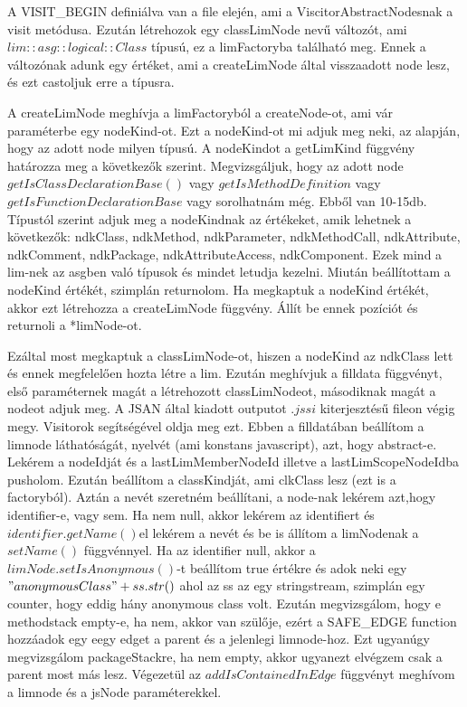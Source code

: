 A VISIT\_BEGIN definiálva van a file elején, ami a ViscitorAbstractNodesnak a visit metódusa.
Ezután létrehozok egy classLimNode nevű változót, ami ${lim::asg::logical::Class}$ típusú, ez a limFactoryba található meg.
Ennek a változónak adunk egy értéket, ami a createLimNode által visszaadott node lesz, és ezt castoljuk erre a típusra.

\noindent

A createLimNode meghívja a limFactoryból a createNode-ot, ami vár paraméterbe egy nodeKind-ot. Ezt a nodeKind-ot mi adjuk meg neki, az alapján, hogy az adott node milyen típusú.
A nodeKindot a getLimKind függvény határozza meg a következők szerint.
Megvizsgáljuk, hogy az adott node $getIsClassDeclarationBase()$ vagy $getIsMethodDefinition$ vagy $getIsFunctionDeclarationBase$ vagy sorolhatnám még. Ebből van 10-15db.
Típustól szerint adjuk meg a nodeKindnak az értékeket, amik lehetnek a következők: ndkClass, ndkMethod, ndkParameter, ndkMethodCall, ndkAttribute, ndkComment, ndkPackage, ndkAttributeAccess, ndkComponent.
Ezek mind a lim-nek az asgben való típusok és mindet letudja kezelni. Miután beállítottam a nodeKind értékét, szimplán returnolom.
Ha megkaptuk a nodeKind értékét, akkor ezt létrehozza a createLimNode függvény. Állít be ennek pozíciót és returnoli a *limNode-ot.

\noindent

Ezáltal most megkaptuk a classLimNode-ot, hiszen a nodeKind az ndkClass lett és ennek megfelelően hozta létre a lim.
Ezután meghívjuk a filldata függvényt, első paraméternek magát a létrehozott classLimNodeot, másodiknak magát a nodeot adjuk meg.
A JSAN által kiadott outputot $.jssi$ kiterjesztésű fileon végig megy. Visitorok segítségével oldja meg ezt.
Ebben a filldatában beállítom a limnode láthatóságát, nyelvét (ami konstans javascript), azt, hogy abstract-e.
Lekérem a nodeIdját és a lastLimMemberNodeId illetve a lastLimScopeNodeIdba pusholom. Ezután beállítom a classKindját, ami clkClass lesz (ezt is a factoryból).
Aztán a nevét szeretném beállítani, a node-nak lekérem azt,hogy identifier-e, vagy sem. Ha nem null, akkor lekérem az identifiert és $identifier.getName()$el lekérem a nevét és be is állítom a limNodenak a $setName()$ függvénnyel.
Ha az identifier null, akkor a $limNode.setIsAnonymous()$-t beállítom true értékre és adok neki egy $"anonymousClass"+ ss.str()$ ahol az ss az egy stringstream, szimplán egy counter, hogy eddig hány anonymous class volt.
Ezután megvizsgálom, hogy e methodstack empty-e, ha nem, akkor van szülője, ezért a SAFE\_EDGE function hozzáadok egy eegy edget a parent és a jelenlegi limnode-hoz.
Ezt ugyanúgy megvizsgálom packageStackre, ha nem empty, akkor ugyanezt elvégzem csak a parent most más lesz.
Végezetül az $addIsContainedInEdge$ függvényt meghívom a limnode és a jsNode paraméterekkel.

